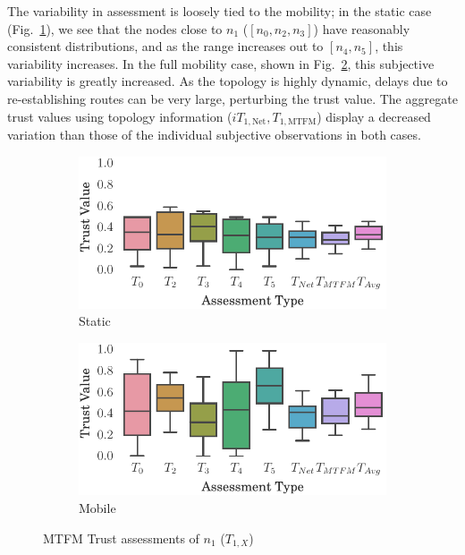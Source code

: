 \documentclass[runningheads,a4paper]{llncs}
\begin{document}
The variability in assessment is loosely tied to the mobility; in the static case (Fig.~\ref{fig:trust_static}), we see that the nodes close to $n_1$ ($[n_0,n_2,n_3]$) have reasonably consistent distributions, and as the range increases out to $[n_4,n_5]$, this variability increases.
In the full mobility case, shown in Fig.~\ref{fig:trust_all_mobile}, this subjective variability is greatly increased. 
As the topology is highly dynamic, delays due to re-establishing routes can be very large, perturbing the trust value.
The aggregate trust values using topology information ($iT_{1,\text{Net}},T_{1,\text{MTFM}}$) display a decreased variation than those of the individual subjective observations in both cases.
%
\begin{figure}[h]
\begin{subfigure}{.5\textwidth}
  \centering
  \includegraphics[width=\linewidth]{img/trust_bella_static.pdf}
  \caption{Static}
  \label{fig:trust_static}
\end{subfigure}%
\begin{subfigure}{.5\textwidth}
\centering
  \includegraphics[width=\linewidth]{img/trust_bella_all_mobile.pdf}
  \caption{Mobile}
  \label{fig:trust_all_mobile}
\end{subfigure}
\caption{MTFM Trust assessments of $n_1$ ($T_{1,X}$)\protect\footnotemark}
\label{fig:trust_mobility}
\end{figure}
%
\end{document}
